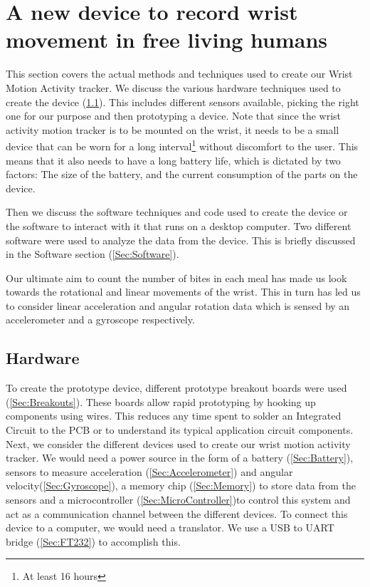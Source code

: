 \chapter{A new device to record wrist movement in free living humans}
\label{Chap:Methods}
This section covers the actual methods and techniques used to create our Wrist Motion Activity tracker. We discuss the various hardware techniques used to create the device (\ref{Sec:Hardware}). This includes different sensors available, picking the right one for our purpose and then prototyping a device. Note that since the wrist activity motion tracker is to be mounted on the wrist, it needs to be a small device that can be worn for a long interval\footnote{At least 16 hours} without discomfort to the user. This means that it also needs to have a long battery life, which is dictated by two factors: The size of the battery, and the current consumption of the parts on the device.


Then we discuss the software techniques and code used to create the device or the software to interact with it that runs on a desktop computer. Two different software were used to analyze the data from the device. This is briefly discussed in the Software section (\ref{Sec:Software}). 

Our ultimate aim to count the number of bites in each meal has made us look towards the rotational and linear movements of the wrist. This in turn has led us to consider linear acceleration and angular rotation data which is sensed by an accelerometer and a gyroscope respectively.



\section{Hardware}
\label{Sec:Hardware}
To create the prototype device, different prototype breakout boards were used (\ref{Sec:Breakouts}). These boards allow rapid prototyping by hooking up components using wires. This reduces any time spent to solder an Integrated Circuit to the PCB or to understand its typical application circuit components. Next, we consider the different devices used to create our wrist motion activity tracker. We would need a power source in the form of a battery (\ref{Sec:Battery}), sensors to measure acceleration (\ref{Sec:Accelerometer}) and angular velocity(\ref{Sec:Gyroscope}), a memory chip (\ref{Sec:Memory}) to store data from the sensors and a microcontroller (\ref{Sec:MicroController})to control this system and act as a communication channel between the different devices. To connect this device to a computer, we would need a translator. We use a USB to UART bridge (\ref{Sec:FT232}) to accomplish this.

